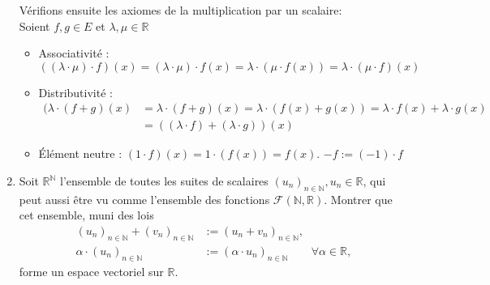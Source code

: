 \documentclass[a4paper, 10pt]{report}
\begin{document}
\begin{enumerate}[label=\arabic*.]
{\begin{minipage}{0.9\textwidth}
				\vspace{5mm}
				Vérifions ensuite les axiomes de la multiplication par
				un scalaire:\\
				Soient $f, g \in E$ et $\lambda, \mu \in \mathbb{R}$
				\begin{itemize}
					\item Associativité : 
					\[
						((\lambda \cdot \mu) \cdot f)(x)
						= (\lambda \cdot \mu) \cdot f(x)
						= \lambda \cdot (\mu \cdot f(x))
						= \lambda \cdot (\mu \cdot f)(x)
					\]
					\item Distributivité :
					\[
					\begin{aligned}
						(\lambda \cdot (f + g)(x)
						&= \lambda \cdot (f + g)(x)
						= \lambda \cdot (f(x) + g(x))
						= \lambda \cdot f(x) + \lambda \cdot g(x)\\
						&= ((\lambda \cdot f) + (\lambda \cdot g))(x)
					\end{aligned}
					\]
					\item Élément neutre : $(1 \cdot f)(x) =
						1 \cdot (f(x)) = f(x)$.
					$-f := (-1) \cdot f$
				\end{itemize}
			\end{minipage}
		}
		
		\item Soit $\mathbb{R}^{\mathbb{N}}$ l'ensemble de toutes
		les suites de scalaires
		$(u_n)_{n \in \mathbb{N}}, u_n \in \mathbb{R}$, qui peut
		aussi être vu comme l'ensemble des fonctions
		$\mathcal{F}(\mathbb{N}, \mathbb{R})$. Montrer que cet
		ensemble, muni des lois
		\[
			\begin{split}
				(u_n)_{n \in \mathbb{N}} + (v_n)_{n \in \mathbb{N}} &:=
				(u_n + v_n)_{n \in \mathbb{N}},\\
				\alpha \cdot (u_n)_{n \in \mathbb{N}} &:=
				(\alpha \cdot u_n)_{n \in \mathbb{N}}
				\qquad
				\forall \alpha \in \mathbb{R},
			\end{split}
		\]
		forme un espace vectoriel sur $\mathbb{R}$.
		

\end{enumerate}
\end{document}
